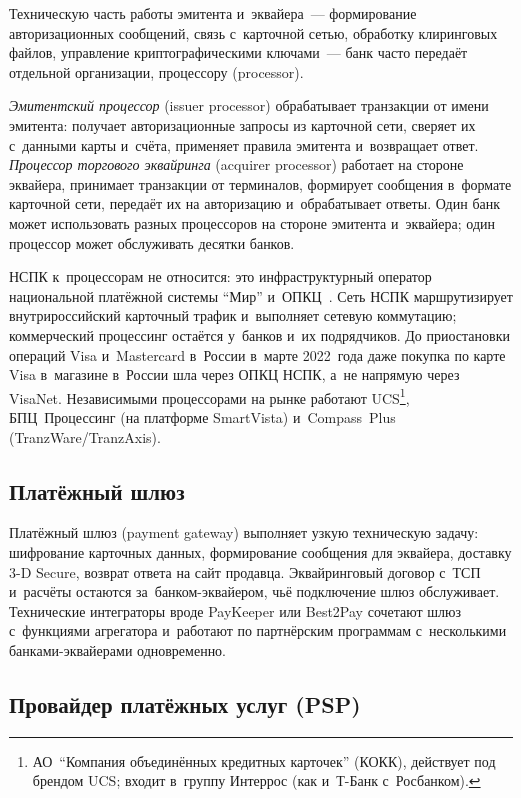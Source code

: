 Техническую часть работы эмитента и~эквайера~--- формирование авторизационных
сообщений, связь с~карточной сетью, обработку клиринговых файлов, управление
криптографическими ключами~--- банк часто передаёт отдельной организации,
процессору (processor).

\emph{Эмитентский процессор} (issuer processor)
обрабатывает транзакции от имени эмитента: получает авторизационные запросы из
карточной сети, сверяет их с~данными карты и~счёта, применяет правила эмитента
и~возвращает ответ. \emph{Процессор торгового эквайринга} (acquirer processor)
работает на стороне эквайера, принимает транзакции от терминалов, формирует
сообщения в~формате карточной сети, передаёт их на авторизацию и~обрабатывает
ответы. Один банк может использовать разных процессоров на стороне эмитента
и~эквайера; один процессор может обслуживать десятки банков.

НСПК к~процессорам не относится: это инфраструктурный оператор национальной
платёжной системы \enquote{Мир} и~ОПКЦ~\cite{cbr-ps,nspk-about-company}. Сеть
НСПК маршрутизирует внутрироссийский карточный трафик и~выполняет сетевую
коммутацию; коммерческий процессинг остаётся у~банков и~их подрядчиков. До приостановки операций Visa и~Mastercard
в~России в~марте 2022~года даже покупка по карте Visa в~магазине в~России шла
через ОПКЦ НСПК, а~не напрямую через VisaNet. Независимыми процессорами на рынке
работают UCS\footnote{АО~\enquote{Компания объединённых кредитных карточек}
(КОКК), действует под брендом UCS; входит в~группу Интеррос (как и~Т-Банк с~Росбанком).}, БПЦ~Процессинг (на
платформе SmartVista) и~Compass~Plus (TranzWare\slash TranzAxis).

\subsection*{Платёжный шлюз}

Платёжный шлюз (payment gateway) выполняет узкую техническую задачу:
шифрование карточных данных, формирование сообщения для эквайера, доставку 3-D
Secure, возврат ответа на сайт продавца. Эквайринговый договор с~ТСП
и~расчёты остаются за~банком-эквайером, чьё подключение шлюз обслуживает. Технические интеграторы вроде
PayKeeper или Best2Pay сочетают шлюз с~функциями агрегатора и~работают по
партнёрским программам с~несколькими банками-эквайерами одновременно.

\subsection*{Провайдер платёжных услуг (PSP)}

